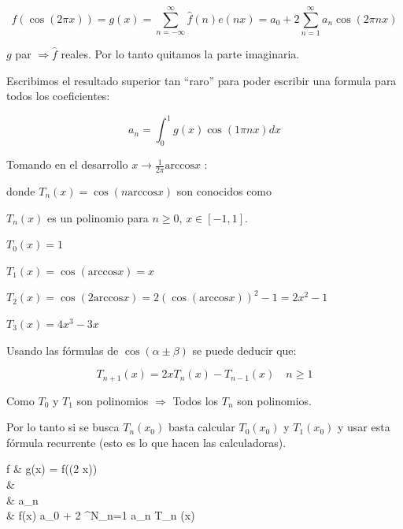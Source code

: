 		$$f(\cos (2 \pi x)) = g(x) = \sum\limits^{\infty}_{n = -\infty} \hat{f}(n) e(nx) = a_0 + 2 \sum\limits^{\infty}_{n=1} a_n \cos(2 \pi nx)$$

		\begin{obs}
			$g$ par $\Rightarrow \hat{f}$ reales. Por lo tanto quitamos la parte imaginaria.
		\end{obs}

		Escribimos el resultado superior tan ``raro'' para poder escribir una formula para todos los coeficientes:

		$$ a_n = \int^{1}_0 g(x) \cos (1 \pi n x) dx $$

		Tomando en el desarrollo $x \to \frac{1}{2 \pi} \text{arccos} x$ :


		donde $T_n (x) = \cos (n \text{arccos} x)$ son conocidos como 
		\begin{obs}
			$T_n (x)$ es un polinomio para $n \geq 0$, $x \in [-1,1]$.
		\end{obs}

		\begin{example}
			$T_0 (x) = 1$

			$T_1 (x) = \cos (\text{arccos} x) = x$

			$T_2 (x) = \cos (2 \text{arccos} x) = 2 (\cos (\text{arccos} x))^2 - 1 = 2x^2 - 1$

			$T_3 (x) = 4x^3 - 3x$
		\end{example}


		Usando las fórmulas de $\cos ( \alpha \pm \beta)$ se puede deducir que:

		$$T_{n+1} (x) = 2 x T_n (x) - T_{n-1} (x) \quad n \geq 1$$

		Como $T_0$ y $T_1$ son polinomios $\Rightarrow$ Todos los $T_n$ son polinomios.

		\begin{obs}
			Por lo tanto si se busca $T_n (x_0)$ basta calcular $T_0 (x_0)$ y $T_1 (x_0)$ y usar esta fórmula recurrente (esto es lo que hacen las calculadoras).
		\end{obs}

		\begin{aligned}
		f  & \Rightarrow g(x) = f(\cos (2 \pi x)) \\
		& \Rightarrow {} \\
		& \Rightarrow a_n   \\
		& \Rightarrow f(x) \equiv a_0 + 2 \sum\limits^{N}_{n=1} a_n T_n (x)  \\
		\end{aligned}



